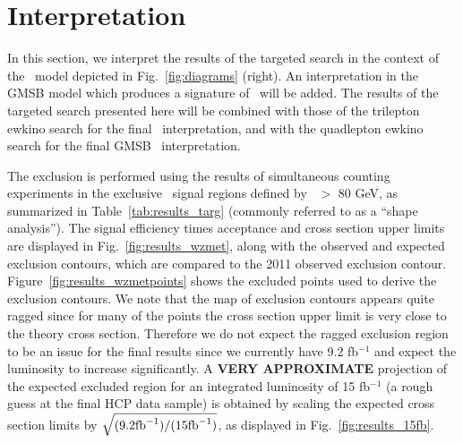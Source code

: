 \section{Interpretation}

In this section, we interpret the results of the targeted search in the context of the \wzmet\ model depicted in Fig.~\ref{fig:diagrams} (right).
An interpretation in the GMSB model which produces a signature of \zzmet\ will be added. The results of the targeted search presented here
will be combined with those of the trilepton ewkino search for the final \wzmet\ interpretation, and with the quadlepton ewkino search
for the final GMSB \zzmet\ interpretation.

The exclusion is performed using the results of simultaneous counting experiments in the exclusive \MET\ signal regions defined by \MET\ $>$ 80 GeV,
as summarized in Table~\ref{tab:results_targ} (commonly referred to as a ``shape analysis''). 
The signal efficiency times acceptance and cross section upper limits are displayed in Fig.~\ref{fig:results_wzmet},
along with the observed and expected exclusion contours, which are compared to the 2011 observed exclusion contour.
Figure~\ref{fig:results_wzmetpoints} shows the excluded points used to derive the exclusion contours. We note that the map of exclusion
contours appears quite ragged since for many of the points the cross section upper limit is very close to the theory cross section.
Therefore we do not expect the ragged exclusion region to be an issue for the final results since
we currently have 9.2 fb$^{-1}$ and expect the luminosity to increase significantly. A {\bf VERY APPROXIMATE} projection of the expected excluded region
for an integrated luminosity of 15 fb$^{-1}$ (a rough guess at the final HCP data sample) is obtained by scaling the expected cross section limits by 
$\sqrt{(9.2 \rm{fb}^{-1})/(15 \rm{fb}^{-1})}$, as displayed in Fig.~\ref{fig:results_15fb}.

